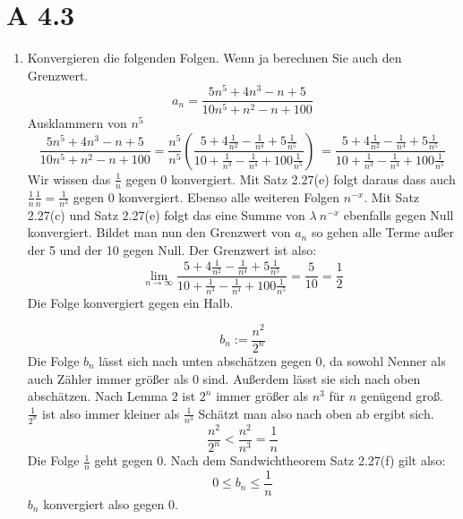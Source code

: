 \documentclass{article}
\begin{document}
    \section*{A 4.3}
    \begin{enumerate}[ label= (\roman*) ]
        \item Konvergieren die folgenden Folgen. Wenn ja berechnen Sie auch den Grenzwert.
        \[a_n = \frac{ 5 n^5 + 4 n^3 - n + 5 }{ 10 n ^5 + n^2 - n + 100 } \]
        Ausklammern von \(n^5\)
        \[ 
            \frac{ 5 n^5 + 4 n^3 - n + 5 }{ 10 n ^5 + n^2 - n + 100}
            = \frac{n^5}{n^5} \left( \frac{5 + 4 \frac{1}{n^2} - \frac{1}{n^4} + 5 \frac{1}{n^5} }{ 10 + \frac{1}{n^3} - \frac{1}{n^4} + 100 \frac{1}{n^5} } \right)\
            = \frac{5 + 4 \frac{1}{n^2} - \frac{1}{n^4} + 5 \frac{1}{n^5} }{ 10 + \frac{1}{n^3} - \frac{1}{n^4} + 100 \frac{1}{n^5} }
        \]
        Wir wissen das \(\frac{1}{n}\) gegen 0 konvergiert. Mit Satz 2.27(e) folgt daraus dass auch \(\frac{1}{n} \frac{1}{n} = \frac{1}{n^2}\) gegen 0 konvergiert.
        Ebenso alle weiteren Folgen \(n^{-x}\). Mit Satz 2.27(c) und Satz 2.27(e) folgt das eine Summe von \(\lambda \: n^{-x}\) ebenfalls gegen Null konvergiert.
        Bildet man nun den Grenzwert von \(a_n\) so gehen alle Terme außer der 5 und der 10 gegen Null. Der Grenzwert ist also:
        \[
            \lim_{n \to \infty} \frac{5 + 4 \frac{1}{n^2} - \frac{1}{n^4} + 5 \frac{1}{n^5} }{ 10 + \frac{1}{n^3} - \frac{1}{n^4} + 100 \frac{1}{n^5} }
            = \frac{5}{10} = \frac{1}{2}
        \]
        Die Folge konvergiert gegen ein Halb.

        \[b_n := \frac{n^2}{2^n} \]
        Die Folge \(b_n\) lässt sich nach unten abschätzen gegen 0, da sowohl Nenner als auch Zähler immer größer als 0 sind.
        Außerdem lässt sie sich nach oben abschätzen. Nach Lemma 2 ist \(2^n\) immer größer als \(n^3\) für \(n\) genügend groß.
        \( \frac{1}{2^n} \) ist also immer kleiner als \( \frac{1}{n^3} \)
        Schätzt man also nach oben ab ergibt sich.
        \[ \frac{n^2}{2^n} < \frac{n^2}{n^3} = \frac{1}{n} \]
        Die Folge \(\frac{1}{n}\) geht gegen 0.
        Nach dem Sandwichtheorem Satz 2.27(f) gilt also:
        \[0 \leq b_n \leq \frac{1}{n} \]
        \(b_n\) konvergiert also gegen 0.


\end{enumerate}
\end{document}
